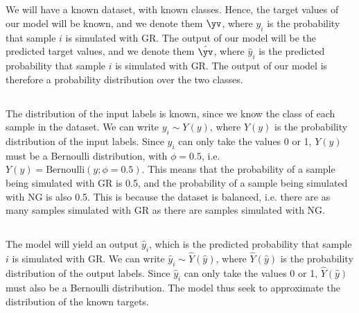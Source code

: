 \section{}
        We will have a known dataset, with known classes. Hence, the target values of our model will be known, and we denote them $\yv$, where $y_i$ is the probability that sample $i$ is simulated with GR. The output of our model will be the predicted target values, and we denote them $\hat{\yv}$, where $\hat{y}_i$ is the predicted probability that sample $i$ is simulated with GR. The output of our model is therefore a probability distribution over the two classes. 

    \subsection{}
        The distribution of the input labels is known, since we know the class of each sample in the dataset. We can write $y_i\sim Y(y)$, where $Y(y)$ is the probability distribution of the input labels. Since $y_i$ can only take the values 0 or 1, $Y(y)$ must be a Bernoulli distribution, with $\phi=0.5$, i.e. $Y(y) = \mathrm{Bernoulli}(y; \phi=0.5)$. This means that the probability of a sample being simulated with GR is 0.5, and the probability of a sample being simulated with NG is also 0.5. This is because the dataset is balanced, i.e. there are as many samples simulated with GR as there are samples simulated with NG. 

    \subsection{}
        The model will yield an output $\hat{y}_i$, which is the predicted probability that sample $i$ is simulated with GR. We can write $\hat{y}_i \sim \hat{Y}(\hat{y})$, where $\hat{Y}(\hat{y})$ is the probability distribution of the output labels. Since $\hat{y}_i$ can only take the values 0 or 1, $\hat{Y}(\hat{y})$ must also be a Bernoulli distribution. The model thus seek to approximate the distribution of the known targets. 

